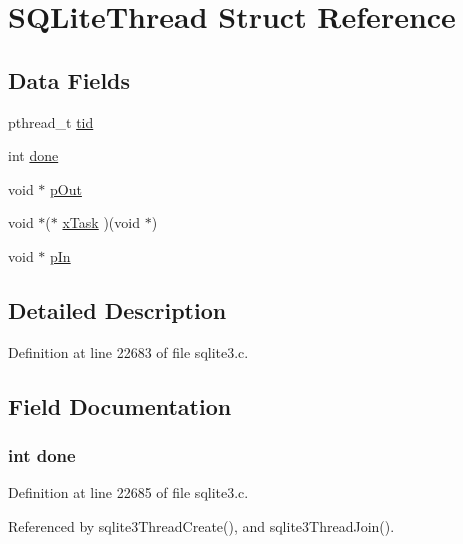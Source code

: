 \hypertarget{struct_s_q_lite_thread}{}\section{S\+Q\+Lite\+Thread Struct Reference}
\label{struct_s_q_lite_thread}
\subsection*{Data Fields}
\begin{DoxyCompactItemize}
\item 
pthread\+\_\+t \hyperlink{struct_s_q_lite_thread_a3a5ba243b3ab4b6093afb178de0f9509}{tid}
\item 
int \hyperlink{struct_s_q_lite_thread_a5992b274cfdcacdbc1fa8347fd01ebde}{done}
\item 
void $\ast$ \hyperlink{struct_s_q_lite_thread_a591d58e265bba73adfd65bfe275ab3c0}{p\+Out}
\item 
void $\ast$($\ast$ \hyperlink{struct_s_q_lite_thread_a32b4eee8a14e8878bd522115b8068d3d}{x\+Task} )(void $\ast$)
\item 
void $\ast$ \hyperlink{struct_s_q_lite_thread_af191c07d957a6f0d5ef67cfa10b745b9}{p\+In}
\end{DoxyCompactItemize}


\subsection{Detailed Description}


Definition at line 22683 of file sqlite3.\+c.



\subsection{Field Documentation}
\hypertarget{struct_s_q_lite_thread_a5992b274cfdcacdbc1fa8347fd01ebde}{}
\subsubsection[{done}]{\setlength{\rightskip}{0pt plus 5cm}int done}\label{struct_s_q_lite_thread_a5992b274cfdcacdbc1fa8347fd01ebde}


Definition at line 22685 of file sqlite3.\+c.



Referenced by sqlite3\+Thread\+Create(), and sqlite3\+Thread\+Join().

